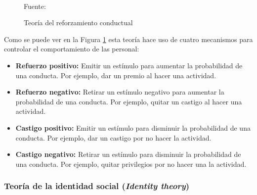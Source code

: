 \begin{figure}[ht]
\caption{Teoría del reforzamiento conductual}
\label{img:TRC}
\centering
{}
\\
{\footnotesize Fuente: }
\end{figure}

Como se puede ver en la Figura \ref{img:TRC} esta teoría hace uso de cuatro mecanismos para controlar el
comportamiento de las personal:

\begin{itemize}
\item \textbf{Refuerzo positivo:} Emitir un estímulo para aumentar la probabilidad de una conducta. Por 
ejemplo, dar un premio al hacer una actividad.
\item \textbf{Refuerzo negativo:} Retirar un estímulo negativo para aumentar la probabilidad de una conducta.
Por ejemplo, quitar un castigo al hacer una actividad.
\item \textbf{Castigo positivo:} Emitir un estímulo para disminuir la probabilidad de una conducta. Por 
ejemplo, dar un castigo por no hacer la actividad.
\item \textbf{Castigo negativo:} Retirar un estímulo para disminuir la probabilidad de una conducta. Por 
ejemplo, quitar privilegios por no hacer una la actividad.
\end{itemize}

\subsubsection{Teoría de la identidad social (\textit{Identity theory})}

